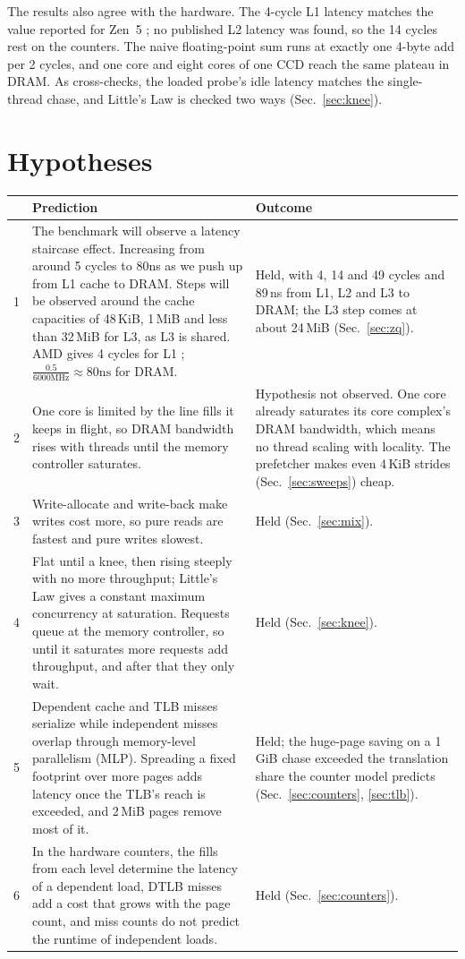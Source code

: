 \documentclass{article}
\begin{document}
The results also agree with the hardware. The 4-cycle L1 latency matches the value reported for Zen~5 \cite{amdhc}; no published L2 latency was found, so the 14 cycles rest on the counters. The naive floating-point sum runs at exactly one 4-byte add per 2 cycles, and one core and eight cores of one CCD reach the same plateau in DRAM. As cross-checks, the loaded probe's idle latency matches the single-thread chase, and Little's Law is checked two ways (Sec.~\ref{sec:knee}).

\section{Hypotheses}\label{sec:hyp}
{\small
\begin{longtable}{@{}lp{7.7cm}p{7.7cm}@{}}
\toprule
& \textbf{Prediction} & \textbf{Outcome} \\
\midrule
\endhead
1 & The benchmark will observe a latency staircase effect. Increasing from around 5 cycles to 80ns as we push up from L1 cache to DRAM. Steps will be observed around the cache capacities of 48\,KiB, 1\,MiB and less than 32\,MiB for L3, as L3 is shared. AMD gives 4 cycles for L1 \cite{amdhc}; $\frac{0.5}{6000 \text{MHz}} \approx 80\text{ns}$ for DRAM. & Held, with 4, 14 and 49 cycles and 89\,ns from L1, L2 and L3 to DRAM; the L3 step comes at about 24\,MiB (Sec.~\ref{sec:zq}). \\
2 & One core is limited by the line fills it keeps in flight, so DRAM bandwidth rises with threads until the memory controller saturates. & Hypothesis not observed. One core already saturates its core complex's DRAM bandwidth, which means no thread scaling with locality. The prefetcher makes even 4\,KiB strides (Sec.~\ref{sec:sweeps}) cheap. \\
3 & Write-allocate and write-back make writes cost more, so pure reads are fastest and pure writes slowest. & Held (Sec.~\ref{sec:mix}). \\
4 &  Flat until a knee, then rising steeply with no more throughput; Little's Law gives a constant maximum concurrency at saturation. Requests queue at the memory controller, so until it saturates more requests add throughput, and after that they only wait. & Held (Sec.~\ref{sec:knee}). \\
5 & Dependent cache and TLB misses serialize while independent misses overlap through memory-level parallelism (MLP). Spreading a fixed footprint over more pages adds latency once the TLB's reach is exceeded, and 2\,MiB pages remove most of it. & Held; the huge-page saving on a 1\,GiB chase exceeded the translation share the counter model predicts (Sec.~\ref{sec:counters}, \ref{sec:tlb}). \\
6 & In the hardware counters, the fills from each level determine the latency of a dependent load, DTLB misses add a cost that grows with the page count, and miss counts do not predict the runtime of independent loads. & Held (Sec.~\ref{sec:counters}). \\
\bottomrule
\end{longtable}
}
\end{document}
